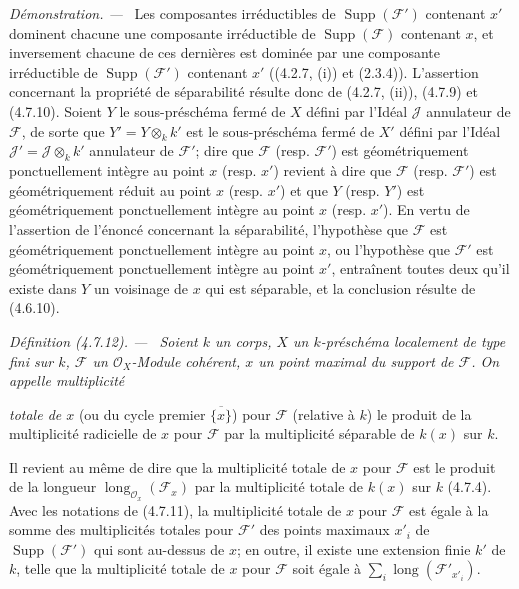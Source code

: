 \documentclass[10pt,oneside]{book}
\newcommand{\oldpage}[2][]{%
  \setcounter{footnote}{0}%
  \marginpar{\scriptsize\textbf{#1}~|~#2}\ignorespaces}
\newenvironment{definition}[1][]{%
  \par\medskip\noindent\itshape Définition (#1). ---\ }{\par}
\newenvironment{proof}{%
  \par\medskip\noindent\textit{Démonstration. ---\ }}{\par}
\begin{document}
\begin{proof}
Les composantes irréductibles de $\operatorname{Supp}(\mathscr F')$ contenant
$x'$ dominent chacune une composante irréductible de
$\operatorname{Supp}(\mathscr F)$ contenant $x$, et inversement chacune de
ces dernières est dominée par une composante irréductible de
$\operatorname{Supp}(\mathscr F')$ contenant $x'$ ((4.2.7, (i)) et (2.3.4)).
L'assertion concernant la propriété de séparabilité résulte donc de (4.2.7,
(ii)), (4.7.9) et (4.7.10). Soient $Y$ le sous-préschéma fermé de $X$ défini
par l'Idéal $\mathscr J$ annulateur de $\mathscr F$, de sorte que
$Y'=Y\otimes_k k'$ est le sous-préschéma fermé de $X'$ défini par l'Idéal
$\mathscr J'=\mathscr J\otimes_k k'$ annulateur de $\mathscr F'$; dire que
$\mathscr F$ (resp. $\mathscr F'$) est géométriquement ponctuellement intègre
au point $x$ (resp. $x'$) revient à dire que $\mathscr F$ (resp.
$\mathscr F'$) est géométriquement réduit au point $x$ (resp. $x'$) et que
$Y$ (resp. $Y'$) est géométriquement ponctuellement intègre au point $x$
(resp. $x'$). En vertu de l'assertion de l'énoncé concernant la séparabilité,
l'hypothèse que $\mathscr F$ est géométriquement ponctuellement intègre au
point $x$, ou l'hypothèse que $\mathscr F'$ est géométriquement ponctuellement
intègre au point $x'$, entraînent toutes deux qu'il existe dans $Y$ un
voisinage de $x$ qui est séparable, et la conclusion résulte de (4.6.10).
\end{proof}

\begin{definition}[4.7.12]
\label{IV.2.4.7.12-fr}
Soient $k$ un corps, $X$ un $k$-préschéma localement de type fini sur $k$,
$\mathscr F$ un $\mathcal O_X$-Module cohérent, $x$ un point maximal du
support de $\mathscr F$. On appelle \emph{multiplicité}

\oldpage[IV-2]{80}

\emph{totale de $x$} (ou du
cycle premier $\overline{\{x\}}$) pour $\mathscr F$ (relative à $k$) le
produit de la multiplicité radicielle de $x$ pour $\mathscr F$ par la
multiplicité séparable de $k(x)$ sur $k$.
\end{definition}

Il revient au même de dire que la multiplicité totale de $x$ pour $\mathscr F$
est le produit de la longueur
$\operatorname{long}_{\mathcal O_x}(\mathscr F_x)$ par la multiplicité totale
de $k(x)$ sur $k$ (4.7.4). Avec les notations de (4.7.11), la multiplicité
totale de $x$ pour $\mathscr F$ est égale à la somme des multiplicités totales
pour $\mathscr F'$ des points maximaux $x'_i$ de
$\operatorname{Supp}(\mathscr F')$ qui sont au-dessus de $x$; en outre, il
existe une extension finie $k'$ de $k$, telle que la multiplicité totale de
$x$ pour $\mathscr F$ soit égale à
$\sum_i\operatorname{long}(\mathscr F'_{x'_i})$.
\end{document}
